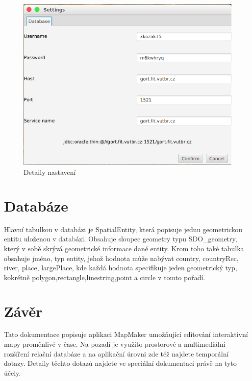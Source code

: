 \documentclass[12pt,a4paper,titlepage]{article}
\begin{document}
\begin{figure}[!htbp]
	\centering
	\includegraphics[scale=0.4]{settings}
	\caption{Detaily nastavení}
	\label{settings}
\end{figure}

\section{Databáze}
Hlavní tabulkou v databázi je SpatialEntity, která popisuje jednu geometrickou entitu uloženou v databázi. Obsahuje sloupec geometry typu SDO\_geometry, který v sobě skrývá geometrické informace dané entity. Krom toho také tabulka obsahuje jméno, typ entity, jehož hodnota může nabývat country, countryRec, river, place, largePlace, kde každá hodnota specifikuje jeden geometrický typ, kokrétně polygon,rectangle,linestring,point a circle v tomto pořadí.

\section{Závěr}
Tato dokumentace popisuje aplikaci MapMaker umožňující editování interaktivní mapy proměnlivé v čase. Na pozadí je využito prostorové a multimediální rozšíření relační databáze a na aplikační úrovni zde též najdete temporální dotazy. Detaily těchto dotazů najdete ve speciální dokumentaci právě na tyto účely.
\end{document}
